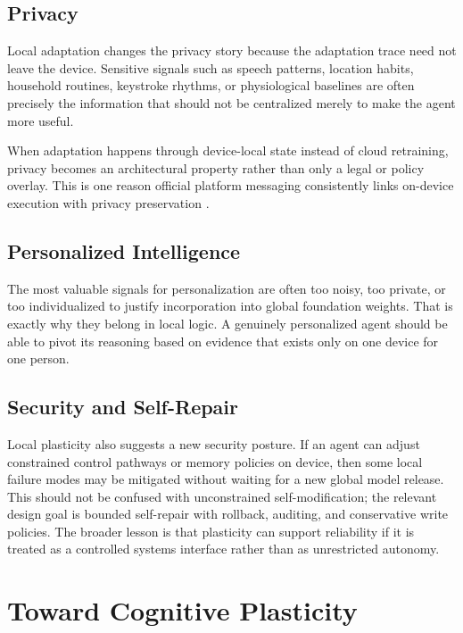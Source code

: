 \documentclass[11pt,a4paper]{article}
\begin{document}
\subsection{Privacy}

Local adaptation changes the privacy story because the adaptation trace need not leave the device. Sensitive signals such as speech patterns, location habits, household routines, keystroke rhythms, or physiological baselines are often precisely the information that should not be centralized merely to make the agent more useful.

When adaptation happens through device-local state instead of cloud retraining, privacy becomes an architectural property rather than only a legal or policy overlay. This is one reason official platform messaging consistently links on-device execution with privacy preservation \cite{apple_coreml, google_edge, apple_wwdc19}.

\subsection{Personalized Intelligence}

The most valuable signals for personalization are often too noisy, too private, or too individualized to justify incorporation into global foundation weights. That is exactly why they belong in local logic. A genuinely personalized agent should be able to pivot its reasoning based on evidence that exists only on one device for one person.

\subsection{Security and Self-Repair}

Local plasticity also suggests a new security posture. If an agent can adjust constrained control pathways or memory policies on device, then some local failure modes may be mitigated without waiting for a new global model release. This should not be confused with unconstrained self-modification; the relevant design goal is bounded self-repair with rollback, auditing, and conservative write policies. The broader lesson is that plasticity can support reliability if it is treated as a controlled systems interface rather than as unrestricted autonomy.

\section{Toward Cognitive Plasticity}
\end{document}
